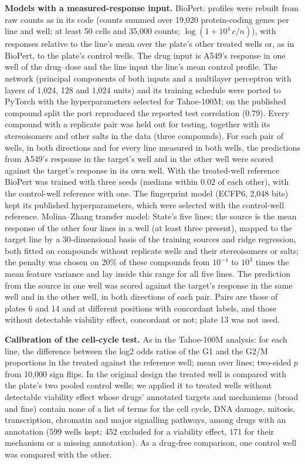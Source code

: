 \documentclass[pdflatex,sn-nature]{sn-jnl}
\begin{document}
\textbf{Models with a measured-response input.} BioPert\cite{kaufmann2026}: profiles were rebuilt from raw counts as in its code (counts summed over 19,020 protein-coding genes per line and well; at least 50 cells and 35,000 counts; $\log(1+10^4\,c/n)$), with responses relative to the line's mean over the plate's other treated wells or, as in BioPert, to the plate's control wells. The drug input is A549's response in one well of the drug--dose and the line input the line's mean control profile. The network (principal components of both inputs and a multilayer perceptron with layers of 1,024, 128 and 1,024 units) and its training schedule were ported to PyTorch with the hyperparameters selected for Tahoe-100M; on the published compound split the port reproduced the reported test correlation (0.79). Every compound with a replicate pair was held out for testing, together with its stereoisomers and other salts in the data (three compounds). For each pair of wells, in both directions and for every line measured in both wells, the predictions from A549's response in the target's well and in the other well were scored against the target's response in its own well. With the treated-well reference BioPert was trained with three seeds (medians within 0.02 of each other), with the control-well reference with one. The fingerprint model (ECFP6, 2,048 bits) kept its published hyperparameters, which were selected with the control-well reference. Molina--Zhang transfer model\cite{molina2026}: State's five lines; the source is the mean response of the other four lines in a well (at least three present), mapped to the target line by a 30-dimensional basis of the training sources and ridge regression, both fitted on compounds without replicate wells and their stereoisomers or salts; the penalty was chosen on 20\% of these compounds from $10^{-4}$ to $10^{3}$ times the mean feature variance and lay inside this range for all five lines. The prediction from the source in one well was scored against the target's response in the same well and in the other well, in both directions of each pair. Pairs are those of plates 6 and 14 and at different positions with concordant labels, and those without detectable viability effect, concordant or not; plate 13 was not used.

\textbf{Calibration of the cell-cycle test.} As in the Tahoe-100M analysis\cite{zhang2026}: for each line, the difference between the log2 odds ratios of the G1 and the G2/M proportions in the treated against the reference well; mean over lines; two-sided $p$ from 10,000 sign flips. In the original design the treated well is compared with the plate's two pooled control wells; we applied it to treated wells without detectable viability effect whose drugs' annotated targets and mechanisms (broad and fine) contain none of a list of terms for the cell cycle, DNA damage, mitosis, transcription, chromatin and major signalling pathways, among drugs with an annotation (599 wells kept; 452 excluded for a viability effect, 171 for their mechanism or a missing annotation). As a drug-free comparison, one control well was compared with the other.
\end{document}
